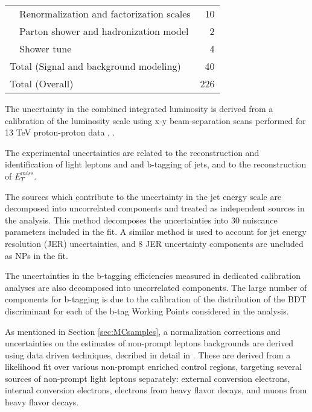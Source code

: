 \begin{table}[H]
\begin{tabular}{lr}
\ \ Renormalization and factorization scales    & 10                  \\
\ \ Parton shower and hadronization model               & 2                   \\
\ \ Shower tune                         & 4                   \\
\hline
Total (Signal and background modeling)       & 40                    \\
\hline\hline
Total (Overall)                             & 226             \\
\hline\hline
\end{tabular}
\label{tab:SystSummary}
\end{table}

The uncertainty in the combined integrated luminosity is derived from a calibration of the luminosity scale using x-y beam-separation scans performed for 13 TeV proton-proton data \cite{lumi}, \cite{LUCID2}.

The experimental uncertainties are related to the reconstruction and identification of light leptons and and b-tagging of jets, and to the reconstruction of $E^{miss}_T$. 

The sources which contribute to the uncertainty in the jet energy scale \cite{jes} are decomposed into uncorrelated components and treated as independent sources in the analysis. This method decomposes the uncertainties into 30 nuiscance parameters included in the fit. A similar method is used to account for jet energy resolution (JER) uncertainties, and 8 JER uncertainty components are uncluded as NPs in the fit.

The uncertainties in the b-tagging efficiencies measured in dedicated calibration analyses \cite{btag_cal} are also decomposed into uncorrelated components. The large number of components for b-tagging is due to the calibration of the distribution of the BDT discriminant for each of the b-tag Working Points considered in the analysis.

As mentioned in Section \ref{sec:MCsamples}, a normalization corrections and uncertainties on the estimates of non-prompt leptons backgrounds are derived using data driven techniques, decribed in detail in \cite{ttH_paper}. These are derived from a likelihood fit over various non-prompt enriched control regions, targeting several sources of non-prompt light leptons separately: external conversion electrons, internal conversion electrons, electrons from heavy flavor decays, and muons from heavy flavor decays. %

